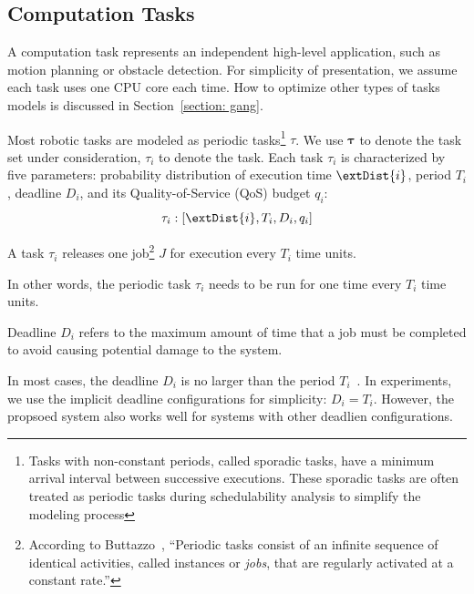 	
	\subsection{Computation Tasks}
    \label{section: system_model_tasks}
    A computation task represents an independent high-level application, such as motion planning or obstacle detection.
    For simplicity of presentation, we assume each task uses one CPU core each time.
    How to optimize other types of tasks models is discussed in Section~\ref{section: gang}.

	
	Most robotic tasks are modeled as periodic tasks\footnote{Tasks with non-constant periods, called sporadic tasks, have a minimum arrival interval between successive executions. These sporadic tasks are often treated as periodic tasks during schedulability analysis to simplify the modeling process} $\tau$. 
    We use $\boldsymbol{\tau}$ to denote the task set under consideration, $\tau_i$ to denote the  task.
    Each task $\tau_i$ is characterized by five parameters: probability distribution of execution time $\extDist{i}$, period $T_i$, deadline $D_i$, and its Quality-of-Service (QoS) budget $q_i$:
	\begin{equation}
		\tau_i: [\extDist{i}, T_i, D_i, q_i]
		\label{eq_notation_task}
	\end{equation}
	

	\begin{definition}[Period, $T_i$]
		A task $\tau_i$ releases one job\footnote{According to Buttazzo~\cite{Buttazzo2011HardRC}, ``Periodic tasks consist of an infinite sequence of identical activities, called instances or \textit{jobs}, that are regularly activated at a constant rate.''} $J$ for execution every $T_i$ time units.
	\end{definition}
    In other words, the periodic task $\tau_i$ needs to be run for one time every $T_i$ time units.
	
	\begin{definition}[Deadline, $D_i$]
		Deadline $D_i$ refers to the maximum amount of time that a job must be completed to avoid causing potential damage to the system.
	\end{definition}
	
	

    In most cases, the deadline $D_i$ is no larger than the period $T_i$~\cite{Buttazzo2011HardRC, Wang2023RTAS}. 
	In experiments, we use the implicit deadline configurations for simplicity: $D_i = T_i$.
	However, the propsoed system also works well for systems with other deadlien configurations.


